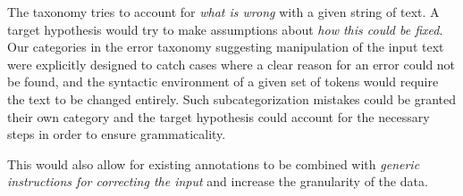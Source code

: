 \documentclass[12pt]{scrartcl}
\begin{document}
The taxonomy tries to account for \textit{what is wrong} with a given string of
text. A target hypothesis would try to make assumptions about \textit{how this
could be fixed}. Our categories in the error taxonomy suggesting manipulation of
the input text were explicitly designed to catch cases where a clear reason for
an error could not be found, and the syntactic environment of a given set of
tokens would require the text to be changed entirely. Such subcategorization
mistakes could be granted their own category and the target hypothesis could
account for the necessary steps in order to ensure grammaticality.

This would also allow for existing annotations to be combined with
\textit{generic instructions for correcting the input} and increase the
granularity of the data.
\end{document}
